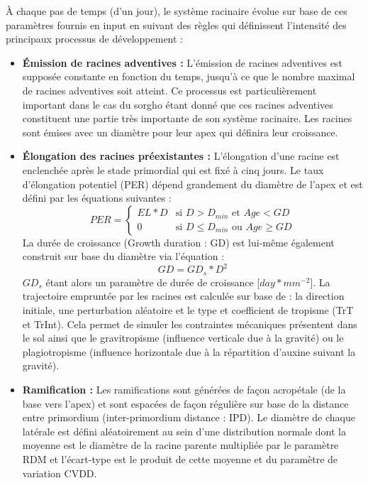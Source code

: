 À chaque pas de temps (d'un jour), le système racinaire évolue sur base de ces paramètres fournis en input en suivant des règles qui définissent l'intensité des principaux processus de développement :

\begin{itemize}
    \item \textbf{Émission de racines adventives :} 
    L'émission de racines adventives est supposée constante en fonction du temps, jusqu'à ce que le nombre maximal de racines adventives soit atteint.
    Ce processus est particulièrement important dans le cas du sorgho étant donné que ces racines adventives constituent une partie très importante de son système racinaire.
    Les racines sont émises avec un diamètre pour leur apex qui définira leur croissance.
    \item \textbf{Élongation des racines préexistantes :}
    L'élongation d'une racine est enclenchée après le stade primordial qui est fixé à cinq jours.
    Le taux d'élongation potentiel (PER) dépend grandement du diamètre de l'apex et est défini par les équations suivantes :
    \begin{equation}
    PER = 
    \begin{cases}
    EL*D & \text{si } D>D_{min} \text{ et } Age < GD \\
    0 & \text{si } D \leq D_{min} \text{ ou } Age \geq GD
    \end{cases}
    \label{eq:PER}
    \end{equation}
    La durée de croissance (Growth duration : GD) est lui-même également construit sur base du diamètre via l'équation :
    \begin{equation} GD=GD_s*D^2 \end{equation}
    $GD_s$ étant alors un paramètre de durée de croissance [$day*mm^{-2}$].
    La trajectoire empruntée par les racines est calculée sur base de : la direction initiale, une perturbation aléatoire et le type et coefficient de tropisme (TrT et TrInt).
    Cela permet de simuler les contraintes mécaniques présentent dans le sol ainsi que le gravitropisme (influence verticale due à la gravité) ou le plagiotropisme (influence horizontale due à la répartition d'auxine suivant la gravité).
    \item \textbf{Ramification :} 
    Les ramifications sont générées de façon acropétale (de la base vers l'apex) et sont espacées de façon régulière sur base de la distance entre primordium (inter-primordium distance : IPD).
    Le diamètre de chaque latérale est défini aléatoirement au sein d'une distribution normale dont la moyenne est le diamètre de la racine parente multipliée par le paramètre RDM et l'écart-type est le produit de cette moyenne et du paramètre de variation CVDD.

\end{itemize}
